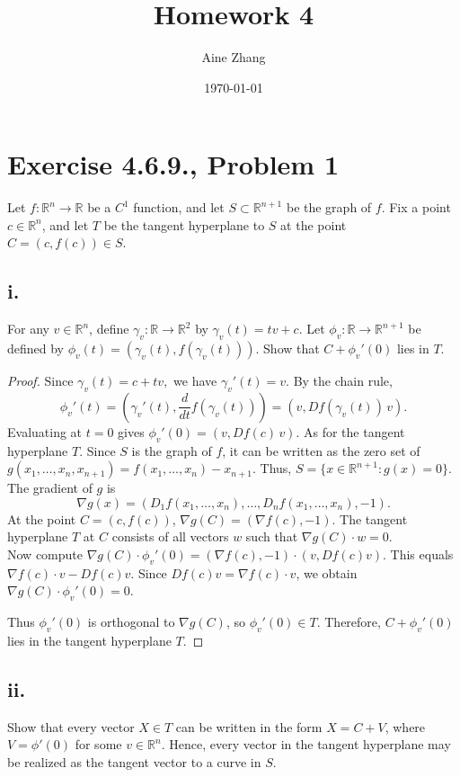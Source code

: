\documentclass{article}
\title{Homework 4}
\author{Aine Zhang}
\date\today
\begin{document}
\maketitle %

\section*{Exercise 4.6.9., Problem 1}
Let $f : \mathbb{R}^n \to \mathbb{R}$ be a $C^1$ function, and let $S \subset \mathbb{R}^{n+1} $ be the graph of $f$. Fix a point $c \in \mathbb{R}^n$, and let $T$ be the tangent hyperplane to $S$ at the point $C = (c, f (c)) \in S$.
\subsection*{i.}
For any $v \in \mathbb{R}^n$, define $\gamma_v : \mathbb{R} \to \mathbb{R}^2$ by $\gamma_v(t) = tv + c$. Let $\phi_v : \mathbb{R} \to \mathbb{R}^{n+1}$ be defined by $\phi_v(t) = (\gamma_v(t), f (\gamma_v(t)))$. Show that $C + \phi_v'(0)$ lies in $T$.
\begin{proof}
Since $\gamma_v(t) = c + tv,$ we have $\gamma_v'(t) = v$. By the chain rule,
\[
\phi_v'(t)
=
\left(\gamma_v'(t), \frac{d}{dt} f(\gamma_v(t))\right)
=
\left(v, Df(\gamma_v(t))\,v\right).
\]
Evaluating at $t=0$ gives $\phi_v'(0) =(v, Df(c)\,v).$
As for the tangent hyperplane $T$. Since $S$ is the graph of $f$, it can be written as the zero set of $g(x_1,\dots,x_n,x_{n+1}) = f(x_1,\dots,x_n) - x_{n+1}.$
Thus, $S = \{x \in \mathbb{R}^{n+1} : g(x)=0\}.$
The gradient of $g$ is
$$\nabla g(x)
=
\left(D_1 f(x_1,\dots,x_n), \dots, D_n f(x_1,\dots,x_n), -1\right).$$
At the point $C = (c, f(c))$, $\nabla g(C) = (\nabla f(c), -1).$
The tangent hyperplane $T$ at $C$ consists of all vectors $w$ such that $\nabla g(C) \cdot w = 0.$ \\
Now compute $\nabla g(C) \cdot \phi_v'(0) = (\nabla f(c), -1) \cdot (v, Df(c)v).$
This equals $\nabla f(c)\cdot v - Df(c)v.$
Since $Df(c)v = \nabla f(c)\cdot v$, we obtain $\nabla g(C) \cdot \phi_v'(0) = 0.$

Thus $\phi_v'(0)$ is orthogonal to $\nabla g(C)$, so $\phi_v'(0) \in T$. Therefore, $C + \phi_v'(0)$ lies in the tangent hyperplane $T$.
\end{proof}

\subsection*{ii.}
Show that every vector $X \in T$ can be written in the form $X = C + V$, where $V = \phi'(0)$ for some $v \in \mathbb{R}^n$. Hence, every vector in the tangent hyperplane may be realized as the tangent vector to a curve in $S$.
\end{document}
